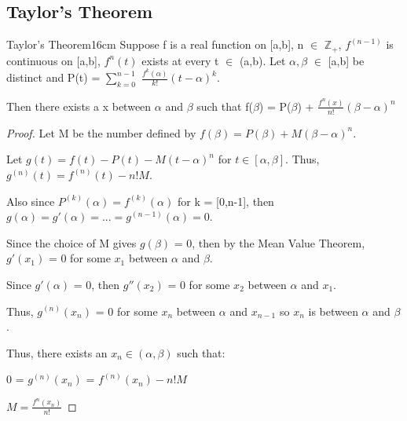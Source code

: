     \newpage





\subsection{ Taylor's Theorem }

    \begin{wtheorem}{Taylor's Theorem}{16cm}
        Suppose f is a real function on [a,b], n $\in$ $\mathbb{Z}_+$,
        $f^{(n-1)}$ is continuous on [a,b], $f^n(t)$ exists at every t $\in$ (a,b).
        Let $\alpha,\beta$ $\in$ [a,b] be distinct and
        P(t) = $\sum_{k=0}^{n-1}$ $\frac{f^k(\alpha)}{k!} (t-\alpha)^k$.

        Then there exists a x between $\alpha$ and $\beta$ such that
        f($\beta$) = P($\beta$) + $\frac{f^n(x)}{n!} (\beta-\alpha)^n$        
    \end{wtheorem}

    \begin{proof}
        Let M be the number defined by
        $f(\beta) = P(\beta) + M(\beta - \alpha)^n$.

        Let $g(t) = f(t) - P(t) - M(t- \alpha)^n$ for $t \in [\alpha,\beta]$.
        Thus, $g^{(n)}(t) = f^{(n)}(t) - n!M$.

        Also since $P^{(k)}(\alpha) = f^{(k)}(\alpha)$ for k = [0,n-1], then
        $g(\alpha) = g'(\alpha) = ... = g^{(n-1)}(\alpha) = 0$.

        Since the choice of M gives $g(\beta)$ = 0, then by the Mean Value Theorem,
        $g'(x_1)$ = 0 for some $x_1$ between $\alpha$ and $\beta$.

        Since $g'(\alpha)$ = 0, then $g''(x_2)$ = 0
        for some $x_2$ between $\alpha$ and $x_1$.

        Thus, $g^{(n)}(x_n)$ = 0 for some $x_n$ between $\alpha$ and $x_{n-1}$
        so $x_n$ is between $\alpha$ and $\beta$.

        Thus, there exists an $x_n \in (\alpha,\beta)$ such that:

        \hspace{1cm}
        0 = $g^{(n)}(x_n)$ = $f^{(n)}(x_n) - n!M$

        \hspace{1cm}
        $M = \frac{f^{n}(x_n)}{n!}$
    \end{proof}

    \vspace{0.5cm}





